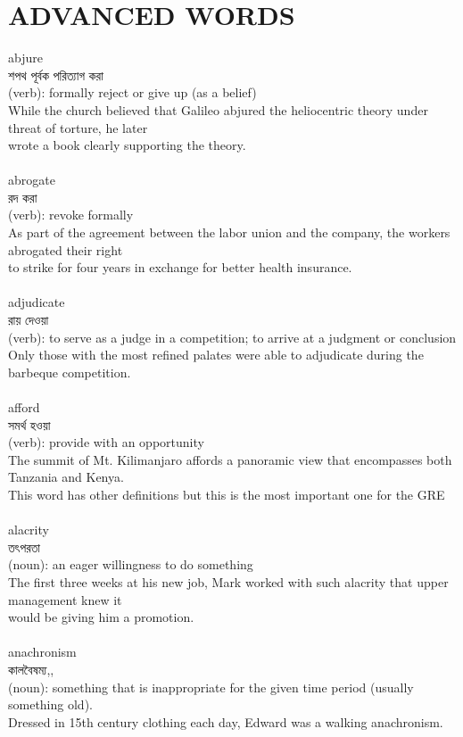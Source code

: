 \documentclass{article}
\begin{document}
\section{ADVANCED WORDS}
{abjure}\\
{শপথ পূর্বক পরিত্যাগ করা}\\
{(verb): formally reject or give up (as a belief)\\While the church believed that Galileo abjured the heliocentric theory under threat of torture, he later\\wrote a book clearly supporting the theory.\\}\\
{abrogate}\\
{রদ করা}\\
{(verb): revoke formally\\As part of the agreement between the labor union and the company, the workers abrogated their right\\to strike for four years in exchange for better health insurance.\\}\\
{adjudicate}\\
{রায় দেওয়া}\\
{(verb): to serve as a judge in a competition; to arrive at a judgment or conclusion\\Only those with the most refined palates were able to adjudicate during the barbeque competition.\\}\\
{afford}\\
{সমর্থ হওয়া}\\
{(verb): provide with an opportunity\\The summit of Mt. Kilimanjaro affords a panoramic view that encompasses both Tanzania and Kenya.\\This word has other definitions but this is the most important one for the GRE\\}\\
{alacrity}\\
{তৎপরতা}\\
{(noun): an eager willingness to do something\\The first three weeks at his new job, Mark worked with such alacrity that upper management knew it\\would be giving him a promotion.\\}\\
{anachronism}\\
{কালবৈষম্য,,}\\
{(noun): something that is inappropriate for the given time period (usually something old).\\Dressed in 15th century clothing each day, Edward was a walking anachronism.\\}\\
\end{document}
